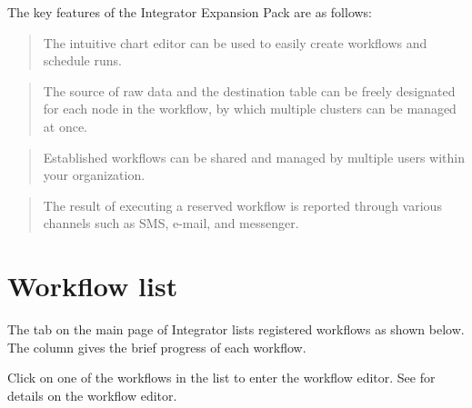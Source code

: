 \documentclass[letterpaper,10pt,english]{sphinxmanual}
\begin{document}
The key features of the Integrator Expansion Pack are as follows:

\begin{quote}

The intuitive chart editor can be used to easily create workflows and schedule runs.
\end{quote}

\begin{quote}

The source of raw data and the destination table can be freely designated for each node in the workflow, by which multiple clusters can be managed at once.
\end{quote}

\begin{quote}

Established workflows can be shared and managed by multiple users within your organization.
\end{quote}

\begin{quote}

The result of executing a reserved workflow is reported through various channels such as SMS, e-mail, and messenger.
\end{quote}


\chapter{Workflow list}
\label{\detokenize{integrator/part02/index:workflow-list}}\label{\detokenize{integrator/part02/index:id1}}\label{\detokenize{integrator/part02/index::doc}}
The  tab on the main page of Integrator lists registered workflows as shown below. The  column gives the brief progress of each workflow.
\begin{quote}

\begin{figure}[H]
\centering

\noindent{}
\end{figure}
\end{quote}

Click on one of the workflows in the list to enter the workflow editor. See {\hyperref[\detokenize{integrator/part03/index:workflow-editor}]{}} for details on the workflow editor.
\end{document}
